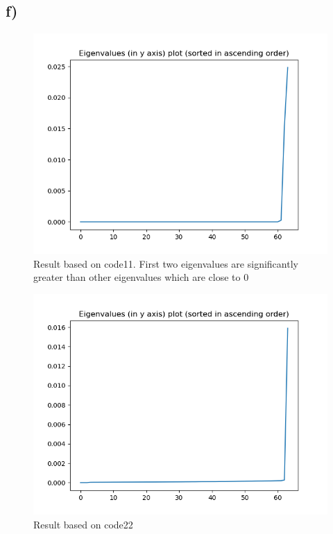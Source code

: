 \documentclass{article}
\begin{document}
\newpage
\thispagestyle{fancy}

\subsection{f)}
\begin{figure}[H]
    \centerline{\includegraphics[scale=0.5]{../results/ellipses/eigen-values.png}}
    \caption{Result based on code11. First two eigenvalues are significantly greater than other eigenvalues which are close to 0}
\end{figure}

\begin{figure}[H]
    \centerline{\includegraphics[scale=0.5]{../results/ellipses/eigen-values2.png}}
    \caption{Result based on code22}
\end{figure}
\end{document}
